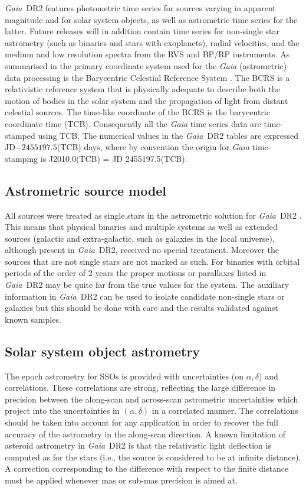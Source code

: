 \documentclass[longauth]{aa_gaia} %
\newcommand\gaia{\textit{Gaia}}
\newcommand\gdr[1]{\gaia~DR#1}
\begin{document}
\gdr{2} features photometric time series for sources varying in apparent magnitude and for solar
system objects, as well as astrometric time series for the latter. Future releases will in addition
contain time series for non-single star astrometry (such as binaries and stars with exoplanets),
radial velocities, and the medium and low resolution spectra from the RVS and BP/RP instruments. As
summarised in \cite{2016A&A...595A...4L} the primary coordinate system used for the {\gaia}
(astrometric) data processing is the Barycentric Celestial Reference System
\citep{2003AJ....126.2687S}. The BCRS is a relativistic reference system that is physically adequate
to describe both the motion of bodies in the solar system and the propagation of light from distant
celestial sources. The time-like coordinate of the BCRS is the barycentric coordinate time (TCB).
Consequently all the {\gaia} time series data are time-stamped using TCB. The numerical values in
the \gdr{2} tables are expressed JD$-2455197.5$(TCB) days, where by convention the origin for
{\gaia} time-stamping is J2010.0(TCB) = JD 2455197.5(TCB).

\subsection{Astrometric source model}

All sources were treated as single stars in the astrometric solution for \gdr{2}
\citep{DR2-DPACP-51}.  This means that physical binaries and multiple systems as well as extended
sources (galactic and extra-galactic, such as galaxies in the local universe), although present in
\gdr{2}, received no special treatment. Moreover the sources that are not single stars are not
marked as such. For binaries with orbital periods of the order of 2 years the proper motions or
parallaxes listed in \gdr{2} may be quite far from the true values for the system. The auxiliary
information in \gdr{2} can be used to isolate candidate non-single stars or galaxies but this should
be done with care and the results validated against known samples.

\subsection{Solar system object astrometry}

The epoch astrometry for SSOs is provided with uncertainties (on $\alpha, \delta$) and correlations.
These correlations are strong, reflecting the large difference in precision between the along-scan
and across-scan astrometric uncertainties which project into the uncertainties in $(\alpha,\delta)$
in a correlated manner. The correlations should be taken into account for any application in order
to recover the full accuracy of the astrometry in the along-scan direction. A known limitation of
asteroid astrometry in \gdr{2} is that the relativistic light deflection is computed as for the
stars (i.e., the source is considered to be at infinite distance). A correction corresponding to the
difference with respect to the finite distance must be applied whenever mas or sub-mas precision is
aimed at.
\end{document}
